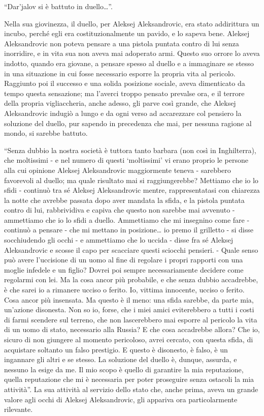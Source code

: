 ``Dar'jalov si è battuto in duello\ldots{}''. 

Nella sua giovinezza, il duello, per Aleksej Aleksandrovic, era stato addirittura un incubo, perché egli era costituzionalmente un pavido, e lo sapeva bene. Aleksej Aleksandrovic non poteva pensare a una pistola puntata contro di lui senza inorridire, e in vita sua non aveva mai adoperato armi. Questo suo orrore lo aveva indotto, quando era giovane, a pensare spesso al duello e a immaginare se stesso in una situazione in cui fosse necessario esporre la propria vita al pericolo. Raggiunto poi il successo e una solida posizione sociale, aveva dimenticato da tempo questa sensazione; ma l'averci troppo pensato prevalse ora, e il terrore della propria vigliaccheria, anche adesso, gli parve così grande, che Aleksej Aleksandrovic indugiò a lungo e da ogni verso ad accarezzare col pensiero la soluzione del duello, pur sapendo in precedenza che mai, per nessuna ragione al mondo, si sarebbe battuto. 

``Senza dubbio la nostra società è tuttora tanto barbara (non così in Inghilterra), che moltissimi - e nel numero di questi `moltissimi' vi erano proprio le persone alla cui opinione Aleksej Aleksandrovic maggiormente teneva - sarebbero favorevoli al duello; ma quale risultato mai si raggiungerebbe? Mettiamo che io lo sfidi - continuò tra sé Aleksej Aleksandrovic mentre, rappresentatasi con chiarezza la notte che avrebbe passata dopo aver mandata la sfida, e la pistola puntata contro di lui, rabbrividiva e capiva che questo non sarebbe mai avvenuto - ammettiamo che io lo sfidi a duello. Ammettiamo che mi insegnino come fare - continuò a pensare - che mi mettano in posizione\ldots{} io premo il grilletto - si disse socchiudendo gli occhi - e ammettiamo che lo uccida - disse fra sé Aleksej Aleksandrovic e scosse il capo per scacciare questi sciocchi pensieri. - Quale senso può avere l'uccisione di un uomo al fine di regolare i propri rapporti con una moglie infedele e un figlio? Dovrei poi sempre necessariamente decidere come regolarmi con lei. Ma la cosa ancor più probabile, e che senza dubbio accadrebbe, è che sarei io a rimanere ucciso o ferito. Io, vittima innocente, ucciso o ferito. Cosa ancor più insensata. Ma questo è il meno: una sfida sarebbe, da parte mia, un'azione disonesta. Non so io, forse, che i miei amici eviterebbero a tutti i costi di farmi scendere sul terreno, che non lascerebbero mai esporre al pericolo la vita di un uomo di stato, necessario alla Russia? E che cosa accadrebbe allora? Che io, sicuro di non giungere al momento pericoloso, avrei cercato, con questa sfida, di acquistare soltanto un falso prestigio. E questo è disonesto, è falso, è un ingannare gli altri e se stesso. La soluzione del duello è, dunque, assurda, e nessuno la esige da me. Il mio scopo è quello di garantire la mia reputazione, quella reputazione che mi è necessaria per poter proseguire senza ostacoli la mia attività''. La sua attività al servizio dello stato che, anche prima, aveva un grande valore agli occhi di Aleksej Aleksandrovic, gli appariva ora particolarmente rilevante. 

